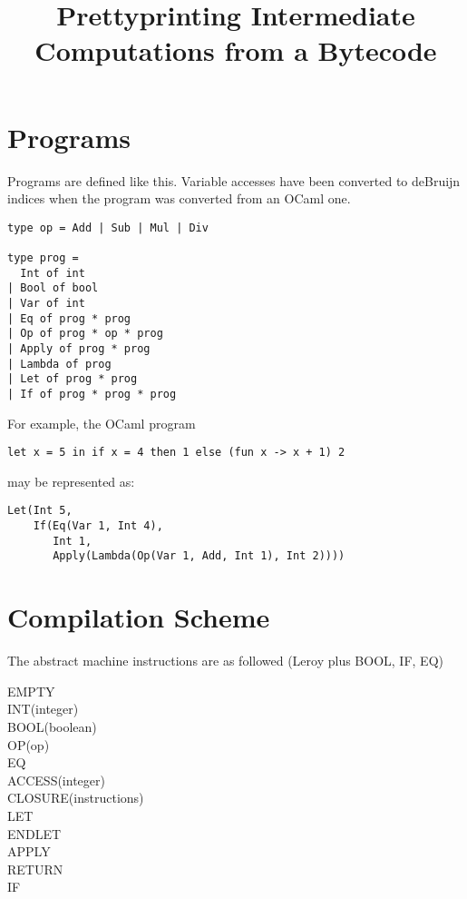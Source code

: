 \documentclass[11pt]{article}
\begin{document}
\title{Prettyprinting Intermediate Computations from a Bytecode}
\maketitle


\section{Programs}

Programs are defined like this. Variable accesses have been converted to deBruijn indices when the program was converted from an OCaml one.

{\small\begin{verbatim}
type op = Add | Sub | Mul | Div

type prog =
  Int of int
| Bool of bool
| Var of int
| Eq of prog * prog
| Op of prog * op * prog
| Apply of prog * prog
| Lambda of prog
| Let of prog * prog
| If of prog * prog * prog\end{verbatim}}

\noindent For example, the OCaml program

\medskip
\noindent\texttt{let x = 5 in if x = 4 then 1 else (fun x -> x + 1) 2}
\medskip

\noindent may be represented as:

\medskip
{\small
\begin{verbatim}Let(Int 5,
    If(Eq(Var 1, Int 4),
       Int 1,
       Apply(Lambda(Op(Var 1, Add, Int 1), Int 2))))\end{verbatim}}


\section{Compilation Scheme}

The abstract machine instructions are as followed (Leroy plus BOOL, IF, EQ)

\medskip

\noindent
EMPTY\\
INT(integer)\\
BOOL(boolean)\\
OP(op)\\
EQ\\
ACCESS(integer)\\
CLOSURE(instructions)\\
LET\\
ENDLET\\
APPLY\\
RETURN\\
IF
\medskip
\end{document}
